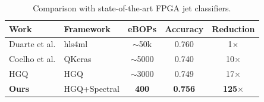 \begin{table}[t]
\centering
\caption{Comparison with state-of-the-art FPGA jet classifiers.}
\label{tab:sota}
\begin{tabular}{llccc}
\toprule
Work & Framework & eBOPs & Accuracy & Reduction \\
\midrule
Duarte et al. \cite{hls4ml} & hls4ml & $\sim$50k & 0.760 & 1$\times$ \\
Coelho et al. \cite{qkeras} & QKeras & $\sim$5000 & 0.740 & 10$\times$ \\
HGQ \cite{hgq} & HGQ & $\sim$3000 & 0.749 & 17$\times$ \\
\textbf{Ours} & HGQ+Spectral & \textbf{400} & \textbf{0.756} & \textbf{125$\times$} \\
\bottomrule
\end{tabular}
\end{table}